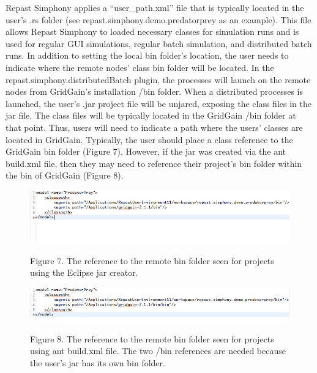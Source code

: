 \documentclass[12pt]{article}
\begin{document}
Repast Simphony applies a ``user\_path.xml'' file that is typically
located in the user's .rs folder (see
repast.simphony.demo.predatorprey as an example). This file allows
Repast Simphony to loaded necessary classes for simulation runs and is
used for regular GUI simulations, regular batch simulation, and
distributed batch runs. In addition to setting the local bin folder's
location, the user needs to indicate where the remote nodes' class bin
folder will be located. In the repast.simphony.distributedBatch
plugin, the processes will launch on the remote nodes from GridGain's
installation /bin folder. When a distributed processes is launched,
the user's .jar project file will be unjared, exposing the class files
in the jar file. The class files will be typically located in the
GridGain /bin folder at that point. Thus, users will need to indicate
a path where the users' classes are located in GridGain. Typically,
the user should place a class reference to the GridGain bin folder (Figure
7). However, if the jar was created via the ant build.xml file, then
they may need to reference their project's bin folder within the bin
of GridGain (Figure 8).

\begin{figure}[!t]
\begin{center}
\includegraphics [width=\textwidth]{images/Figure7.jpg}
\label{cablehealth}
\begin{minipage}{.9\textwidth}Figure 7. The reference to the remote
  bin folder seen for projects using the Eclipse jar creator.
\end{minipage}
\end{center}
\end{figure}

\begin{figure}[!t]
\begin{center}
\includegraphics [width=\textwidth]{images/Figure8.jpg}
\label{cablehealth}
\begin{minipage}{.9\textwidth}Figure 8. The reference to the remote
  bin folder seen for projects using ant build.xml file. The two /bin
  references are needed because the user's jar has its own bin folder.
\end{minipage}
\end{center}
\end{figure}
\end{document}
